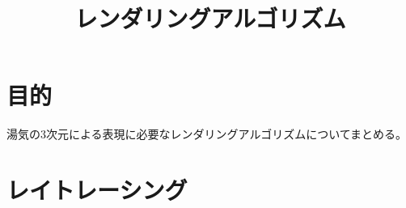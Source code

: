 \documentclass{ujarticle}
\title{レンダリングアルゴリズム}
\begin{document}
\maketitle
\section{目的}
湯気の3次元による表現に必要なレンダリングアルゴリズムについてまとめる。
\section{レイトレーシング}
\end{document}
